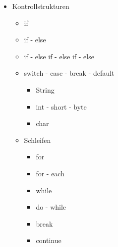 \begin{itemize}
    \item Kontrollstrukturen
    \begin{itemize}
        \item if
        \item if - else
        \item if - else if - else if - else
        \item switch - case - break - default
        \begin{itemize}
            \item String
            \item int - short - byte
            \item char
        \end{itemize}
        \item Schleifen
        \begin{itemize}
            \item for
            \item for - each
            \item while
            \item do - while
            \item break
            \item continue
        \end{itemize}
    \end{itemize}
    

\end{itemize}
